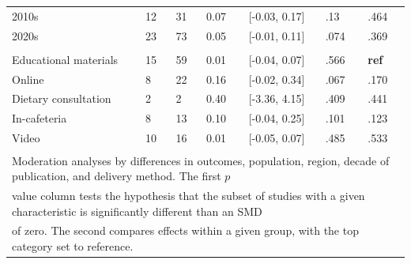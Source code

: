 \documentclass[sn-nature,referee,pdflatex]{sn-jnl}
\begin{document}
\begin{table}[!ht]
\begin{tabular}[t]{lllll>{\raggedright\arraybackslash}p{2 cm}>{\raggedright\arraybackslash}p{2 cm}}
\hspace{1em}2010s & 12 & 31 & 0.07 & {}[-0.03, 0.17] & .13 & .464\\
\hspace{1em}2020s & 23 & 73 & 0.05 & {}[-0.01, 0.11] & .074 & .369\\
\addlinespace[0.3em]
\multicolumn{7}{l}{\textbf{Method of Delivery}}\\
\hspace{1em}Educational materials & 15 & 59 & 0.01 & {}[-0.04, 0.07] & .566 & \textbf{ref}\\
\hspace{1em}Online & 8 & 22 & 0.16 & {}[-0.02, 0.34] & .067 & .170\\
\hspace{1em}Dietary consultation & 2 & 2 & 0.40 & {}[-3.36, 4.15] & .409 & .441\\
\hspace{1em}In-cafeteria & 8 & 13 & 0.10 & {}[-0.04, 0.25] & .101 & .123\\
\hspace{1em}Video & 10 & 16 & 0.01 & {}[-0.05, 0.07] & .485 & .533\\
\bottomrule
\multicolumn{7}{l}{\textsuperscript{} Moderation analyses by differences in outcomes, population, region, decade of publication, and delivery method. The first $p$}\\
\multicolumn{7}{l}{value column tests the hypothesis that the subset of studies with a given characteristic is significantly different than an SMD}\\
\multicolumn{7}{l}{of zero. The second compares effects within a given group, with the top category set to reference.}\\
\end{tabular}
\end{table}
\end{document}
